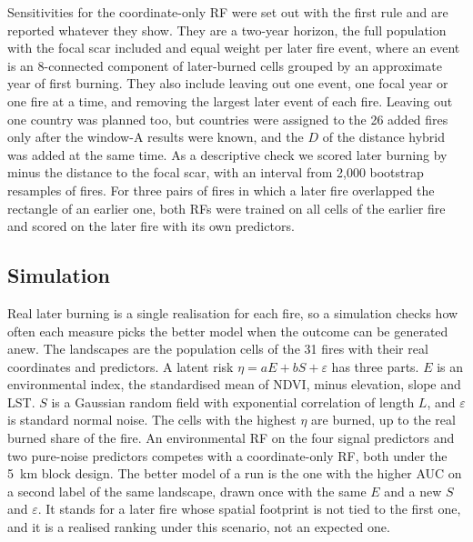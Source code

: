 \documentclass[preprint,12pt,authoryear]{elsarticle}
\begin{document}
Sensitivities for the coordinate-only RF were set out with the first rule and are reported whatever they show. They are a two-year horizon, the full population with the focal scar included and equal weight per later fire event, where an event is an 8-connected component of later-burned cells grouped by an approximate year of first burning. They also include leaving out one event, one focal year or one fire at a time, and removing the largest later event of each fire. Leaving out one country was planned too, but countries were assigned to the 26 added fires only after the window-A results were known, and the $D$ of the distance hybrid was added at the same time. As a descriptive check we scored later burning by minus the distance to the focal scar, with an interval from 2,000 bootstrap resamples of fires. For three pairs of fires in which a later fire overlapped the rectangle of an earlier one, both RFs were trained on all cells of the earlier fire and scored on the later fire with its own predictors.

\subsection{Simulation}
\label{sec:sim}

Real later burning is a single realisation for each fire, so a simulation checks how often each measure picks the better model when the outcome can be generated anew. The landscapes are the population cells of the 31 fires with their real coordinates and predictors. A latent risk $\eta = aE + bS + \varepsilon$ has three parts. $E$ is an environmental index, the standardised mean of NDVI, minus elevation, slope and LST. $S$ is a Gaussian random field with exponential correlation of length $L$, and $\varepsilon$ is standard normal noise. The cells with the highest $\eta$ are burned, up to the real burned share of the fire. An environmental RF on the four signal predictors and two pure-noise predictors competes with a coordinate-only RF, both under the 5~km block design. The better model of a run is the one with the higher AUC on a second label of the same landscape, drawn once with the same $E$ and a new $S$ and $\varepsilon$. It stands for a later fire whose spatial footprint is not tied to the first one, and it is a realised ranking under this scenario, not an expected one.
\end{document}
